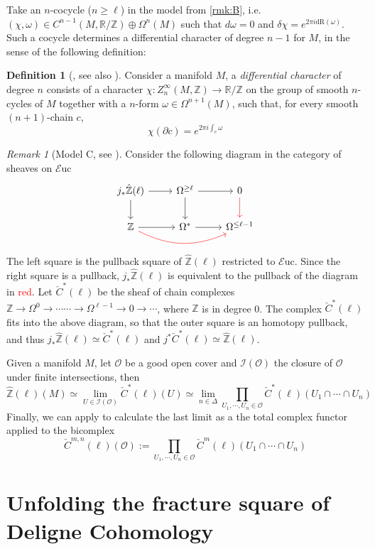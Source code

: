 \documentclass[10pt]{amsart}
\newcommand{\I}{\mathscr{I}}
\newcommand{\bR}{\mathbb{R}}
\newcommand{\bZ}{\mathbb{Z}}
\newcommand{\Euc}{\mathscr{E}\mathrm{uc}}
\newcommand{\dr}{\mathrm{dR}}
\theoremstyle{definition}
\newtheorem{definition}[equation]{Definition}
\theoremstyle{remark}
\newtheorem{remark}[equation]{Remark}
\numberwithin{equation}{section}
\begin{document}
Take an $n$-cocycle ($n\geq\ell$) in the model from \cref{rmk:B}, i.e. $(\chi,\omega)\in C^{n-1}(M,\bR/\bZ)\oplus\Omega^{n}(M)$ such that $d\omega=0$ and $\delta\chi=e^{2\pi i\dr(\omega)}$. Such a cocycle determines a differential character of degree $n-1$ for $M$, in the sense of the following definition:
\begin{definition}[{\cite[Definition 3.4]{hopkinssinger2005diffcoh}}, see also {\cite[Chapter 5]{barbecker2014diffchar}}] Consider a manifold $M$, a \emph{differential character} of degree $n$ consists of a character $\chi:Z^\infty_{n}(M,\bZ)\to\bR/\bZ$ on the group of smooth $n$-cycles of $M$ together with a $n$-form $\omega\in\Omega^{n+1}(M)$, such that, for every smooth $(n+1)$-chain $c$, \[\chi(\partial c)=e^{2\pi i\int_c\omega}\]
\end{definition}

\begin{remark}[Model C, see {\cite[Lemma 7.3.4]{amabeldebrayhaine2021diffcoh}}]\label{rmk:C} Consider the following diagram in the category of {sheaves} on $\Euc$
  \[\begin{tikzcd}
     j_*\hat{\bZ}(\ell)\arrow[d]\arrow[r] & \Omega^{\geq \ell}\arrow[d] \arrow[r] & 0\arrow[d,color=red] \\
    \bZ \arrow[r]\arrow[rr,bend right=2.5em,color=red] & \Omega^*\arrow[r] & \Omega^{\leq\ell-1}
  \end{tikzcd}\] The left square is the pullback square of $\hat{\bZ}(\ell)$ restricted to $\Euc$. Since the right square is a pullback, $j_*\hat{\bZ}(\ell)$ is equivalent to the pullback of the diagram in \textcolor{red}{red}. Let $\check{C}^*(\ell)$ be the sheaf of chain complexes $\bZ\to\Omega^0\to\cdots\cdots\to\Omega^{\ell-1}\to0\to\cdots$, where $\bZ$ is in degree 0. The complex $\check{C}^*(\ell)$ fits into the above diagram, so that the outer square is an homotopy pullback, and thus $j_*\hat{\bZ}(\ell)\simeq\check{C}^*(\ell)$ and $j^*\check{C}^*(\ell)\simeq\hat{\bZ}(\ell)$. 

  Given a manifold $M$, let $\mathscr{O}$ be a good open cover and $\I(\mathscr O)$ the closure of $\mathscr{O}$ under finite intersections, then
\[
    \hat{\bZ}(\ell)(M) \simeq\lim_{U\in\I(\mathscr O)} \check{C}^*(\ell)(U)\simeq\lim_{n\in\Delta}\prod_{U_1,\cdots,U_n\in\mathscr{O}}\check{C}^*(\ell)(U_1\cap\cdots\cap U_n) 
  \]
  Finally, we can apply \cite[Lemma 7.10]{bunkenikolausvoelkl2016diffcoh} to calculate the last limit as a the total complex functor applied to the bicomplex \[\check{C}^{m,n}(\ell)(\mathscr{O}):=\prod_{U_1,\cdots,U_n\in\mathscr{O}}\check{C}^m(\ell)(U_1\cap\cdots\cap U_n)\]
\end{remark}


\section{Unfolding the fracture square of Deligne Cohomology}

{\footnotesize


}
\end{document}
